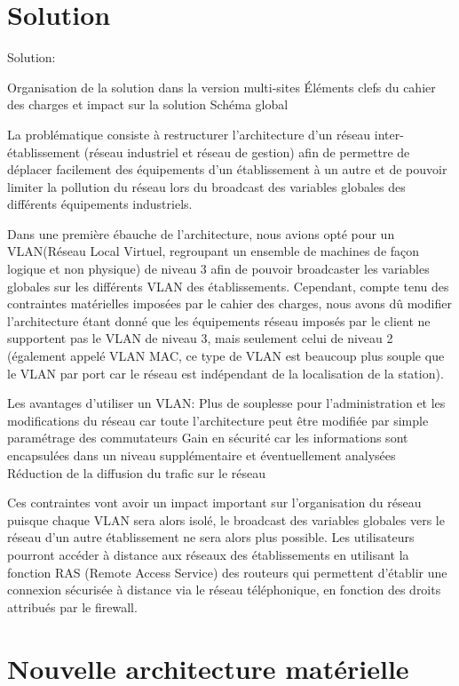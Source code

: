 \section{Solution}

Solution:

Organisation de la solution dans la version multi-sites
Éléments clefs du cahier des charges et impact sur la solution
Schéma global

La problématique consiste à restructurer l'architecture d'un réseau
inter-établissement (réseau industriel et réseau de gestion) afin de
permettre de déplacer facilement des équipements d'un établissement
à un autre et de pouvoir limiter la pollution du réseau lors du broadcast
des variables globales des différents équipements industriels.

Dans une première ébauche de l'architecture, nous avions opté pour un
VLAN(Réseau Local Virtuel, regroupant un ensemble de machines de façon
logique et non physique) de niveau 3 afin de pouvoir broadcaster les variables
globales sur les différents VLAN des établissements. Cependant, compte tenu des
contraintes matérielles imposées par le cahier des charges, nous avons dû
modifier l'architecture étant donné que les équipements réseau imposés par le
client ne supportent pas le VLAN de niveau 3, mais seulement celui de niveau 2
(également appelé VLAN MAC, ce type de VLAN est beaucoup plus souple  que le
VLAN par port car le réseau est indépendant de la localisation de la station). 


Les avantages d'utiliser un VLAN:
Plus de souplesse pour l'administration et les modifications du réseau car toute
l'architecture peut être modifiée par simple paramétrage des commutateurs
Gain en sécurité car les informations sont encapsulées dans un niveau
supplémentaire et éventuellement analysées
Réduction de la diffusion du trafic sur le réseau

Ces contraintes vont avoir un impact important sur l'organisation du réseau
puisque chaque VLAN sera alors isolé, le broadcast des variables globales vers
le réseau d'un autre établissement ne sera alors plus possible. 
Les utilisateurs pourront accéder à distance aux réseaux des établissements en
utilisant la fonction RAS (Remote Access Service) des routeurs qui permettent
d'établir une connexion sécurisée à  distance via le réseau téléphonique, en
fonction des droits attribués par le firewall. 

 \section{Nouvelle architecture matérielle}

